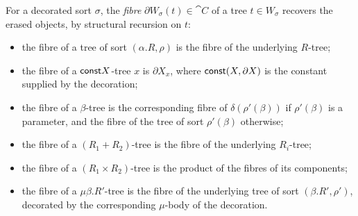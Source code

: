 \begin{definition}[Fibres]
\label{def:polynomial-types:fibres}
For a decorated sort $\sigma$, the \emph{fibre} $\partial W_\sigma(t) \in \cat{C}$ of a tree $t \in
W_\sigma$ recovers the erased objects, by structural recursion on $t$:
\begin{itemize}
\item the fibre of a tree of sort $(\alpha.R, \rho)$ is the fibre of the underlying $R$-tree;
\item the fibre of a $\mathsf{const} X$-tree $x$ is $\partial X_x$, where $\mathsf{const}(X, \partial X)$ is the
  constant supplied by the decoration;
\item the fibre of a $\beta$-tree is the corresponding fibre of $\delta(\rho'(\beta))$ if
  $\rho'(\beta)$ is a parameter, and the fibre of the tree of sort $\rho'(\beta)$ otherwise;
\item the fibre of a $(R_1 + R_2)$-tree is the fibre of the underlying $R_i$-tree;
\item the fibre of a $(R_1 \times R_2)$-tree is the product of the fibres of its components;
\item the fibre of a $\mu\beta.R'$-tree is the fibre of the underlying tree of sort $(\beta.R',
  \rho')$, decorated by the corresponding $\mu$-body of the decoration.
\end{itemize}
\end{definition}

